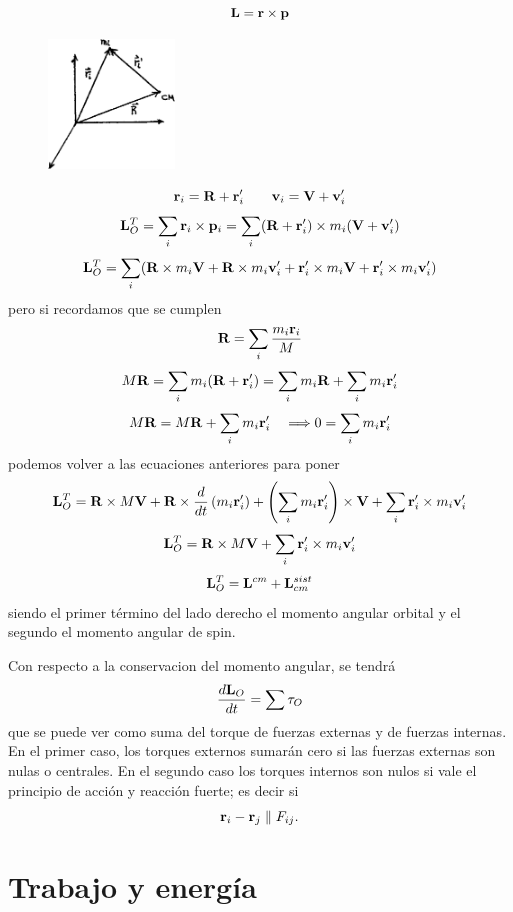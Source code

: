 \documentclass[10pt,oneside]{CBFT_book}
\begin{document}
\[
	\vb{L} = \vb{r} \times \vb{p}
\]
\begin{figure}[hbt]
	\begin{center}
	\includegraphics[width=0.3\textwidth]{images/fig_mc_angularmom.pdf}	
	\end{center}
	\caption{}
\end{figure} 
\[
	\vb{r}_i = \vb{R} + \vb{r}_i' \qquad \vb{v}_i = \vb{V} + \vb{v}_i'
\]
\[
	\vb{L}^T_O = \sum_i \vb{r}_i \times \vb{p}_i = \sum_i (\vb{R} + \vb{r}_i') \times m_i (\vb{V} + \vb{v}_i')
\]
\[
	\vb{L}^T_O = \sum_i ( \vb{R} \times m_i \vb{V}  + \vb{R} \times m_i \vb{v}_i'
	+ \vb{r}_i' \times m_i \vb{V} 	+ \vb{r}_i' \times m_i \vb{v}_i' )
\]
pero si recordamos que se cumplen 
\[
	\vb{R} = \sum_i \frac{m_i \vb{r}_i}{M}
\]
\[
	M\vb{R} = \sum_i m_i (\vb{R} + \vb{r}_i') = \sum_i m_i \vb{R} + \sum_i m_i \vb{r}_i'
\]
\[
	M\vb{R} = M \vb{R} + \sum_i m_i \vb{r}_i' \quad \Longrightarrow 0 = \sum_i m_i \vb{r}_i'
\]
podemos volver a las ecuaciones anteriores para poner
\[
	\vb{L}^T_O = \vb{R} \times M \vb{V}  + \vb{R} \times \frac{d}{dt}\left( m_i \vb{r}_i' \right)
	+ \left( \sum_i m_i \vb{r}_i' \right) \times \vb{V} + \sum_i \vb{r}_i' \times m_i \vb{v}_i'
\]
\[
	\vb{L}^T_O = \vb{R} \times M \vb{V}  + \sum_i \vb{r}_i' \times m_i \vb{v}_i'
\]
\[
	\vb{L}^T_O = \vb{L}^{cm} + \vb{L}^{sist}_{cm}
\]
siendo el primer término del lado derecho el momento angular orbital y el segundo el momento angular
de spin.

Con respecto a la conservacion del momento angular, se tendrá
\[
	\dtot{\vb{L}_O}{t} = \sum \vb{\tau}_O
\]
que se puede ver como suma del torque de fuerzas externas y de fuerzas internas. En el primer caso,
los torques externos sumarán cero si las fuerzas externas son nulas o centrales.
En el segundo caso los torques internos son nulos si vale el principio de acción y reacción fuerte;
es decir si
\[
	\vb{r}_i - \vb{r}_j \parallel F_{ij}.
\]

\section{Trabajo y energía}
\end{document}
